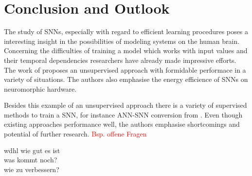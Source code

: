 \section{Conclusion and Outlook}
\label{sec:conclusion}

The study of \acp{SNN}, especially with regard to efficient learning procedures poses a interesting insight in the possibilities of modeling
systems on the human brain.
Concerning the difficulties of training a model which works with input values and their temporal dependencies researchers have already made 
impressive efforts.
The work of \cite{SNN} proposes an unsupervised approach with formidable performace in a variety of situations.
The authors also emphasise the energy efficience of \acp{SNN} on neuromorphic hardware.

Besides this example of an unsupervised approach there is a variety of supervised methods to train a \ac{SNN}, 
for instance \ac{ANN}-\ac{SNN} conversion from \cite{DIET_SNN}.
Even though existing approaches performance well, the authors emphasise shortcomings and potential of further research.
\textcolor{red}{Bsp. offene Fragen}

wdhl wie gut es ist\\
was kommt noch?\\
wie zu verbessern?